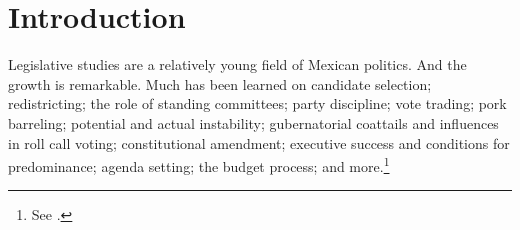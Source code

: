 \documentclass[letter,12pt]{article}
\begin{document}
\doublespacing

\section{Introduction} %



Legislative studies are a relatively young field of Mexican politics. And the growth is remarkable. Much has been learned on candidate selection; redistricting; the role of standing committees; party discipline; vote trading; pork barreling; potential and actual instability; gubernatorial coattails and influences in roll call voting; constitutional amendment; executive success and conditions for predominance; agenda setting; the budget process; and more.\footnote{See \citet{ascencio.kerevel.cand-sel-beh.2021,magar.altman.mcd.trelles2016pg,bejar.Comisiones2009ed.book,tellez-del-rio.2018,lopez.lara.aldf2013,kerevelPork2015,heller.weldon.2003,magar.gubCoatMx.2012,rosas.langston.2011,casar.marvan2014book,bejarQuienLegisla2012,weldon.1997,casar.agsetting.2016,weldon.2002}.}

\end{document}
